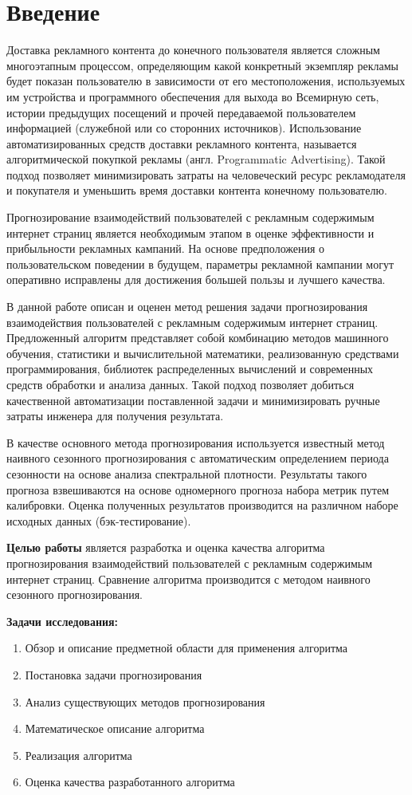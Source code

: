 \section{Введение}

Доставка рекламного контента до конечного пользователя является сложным многоэтапным процессом, определяющим
какой конкретный экземпляр рекламы будет показан пользователю в зависимости от его местоположения,
используемых им устройства и программного обеспечения для выхода во Всемирную сеть, истории предыдущих
посещений и прочей передаваемой пользователем информацией (служебной или со сторонних источников). Использование
автоматизированных средств доставки рекламного контента, называется алгоритмической покупкой рекламы (англ.
Programmatic Advertising). Такой подход позволяет минимизировать затраты на человеческий ресурс рекламодателя и
покупателя и уменьшить время доставки контента конечному пользователю.

Прогнозирование взаимодействий пользователей с рекламным содержимым интернет страниц является необходимым этапом
в оценке эффективности и прибыльности рекламных кампаний. На основе предположения о пользовательском поведении
в будущем, параметры рекламной кампании могут оперативно исправлены для достижения большей пользы и лучшего качества.

В данной работе описан и оценен метод решения задачи прогнозирования взаимодействия пользователей с рекламным 
содержимым интернет страниц. Предложенный алгоритм представляет собой комбинацию методов машинного обучения, 
статистики и вычислительной математики, реализованную средствами программирования, библиотек распределенных
вычислений и современных средств обработки и анализа данных. Такой подход позволяет добиться качественной 
автоматизации поставленной задачи и минимизировать ручные затраты инженера для получения результата.

В качестве основного метода прогнозирования используется известный метод наивного сезонного
прогнозирования с автоматическим определением периода сезонности на основе анализа спектральной плотности.
Результаты такого прогноза взвешиваются на основе одномерного прогноза набора метрик путем калибровки. 
Оценка полученных результатов производится на различном наборе исходных данных (бэк-тестирование).

\textbf{Целью работы} является разработка и оценка качества алгоритма прогнозирования взаимодействий пользователей
с рекламным содержимым интернет страниц. Сравнение алгоритма производится с методом наивного сезонного 
прогнозирования.

\textbf{Задачи исследования:}
\begin{enumerate}
    \item Обзор и описание предметной области для применения алгоритма
    \item Постановка задачи прогнозирования
    \item Анализ существующих методов прогнозирования
    \item Математическое описание алгоритма
    \item Реализация алгоритма
    \item Оценка качества разработанного алгоритма
\end{enumerate}
